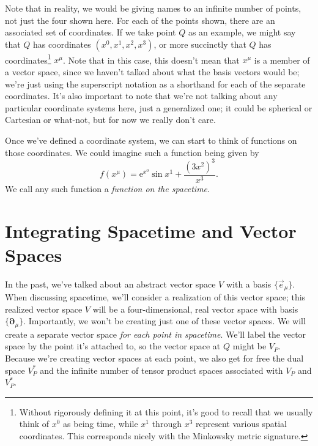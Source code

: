 Note that in reality, we would be giving names to an infinite number of points, not just the four shown here.
For each of the points shown, there are an associated set of coordinates.
If we take point $Q$ as an example, we might say that $Q$ has coordinates $(x^0,x^1,x^2,x^3)$, or more succinctly that $Q$ has coordinates\footnote{Without rigorously defining it at this point, it's good to recall that we usually think of $x^0$ as being time, while $x^1$ through $x^3$ represent various spatial coordinates. This corresponds nicely with the Minkowsky metric signature.} $x^\mu$.
Note that in this case, this doesn't mean that $x^\mu$ is a member of a vector space, since we haven't talked about what the basis vectors would be; we're just using the superscript notation as a shorthand for each of the separate coordinates.
It's also important to note that we're not talking about any particular coordinate systems here, just a generalized one; it could be spherical or Cartesian or what-not, but for now we really don't care.

Once we've defined a coordinate system, we can start to think of functions on those coordinates.
We could imagine such a function being given by
\[ f(x^\mu) = \mathrm{e}^{x^0}\sin x^1 + \frac{(3x^2)^3}{x^3}. \]
We call any such function a \emph{function on the spacetime}.

\section{Integrating Spacetime and Vector Spaces}
In the past, we've talked about an abstract vector space $V$ with a basis $\{\vec{e}_\mu\}$.
When discussing spacetime, we'll consider a realization of this vector space;
this realized vector space $V$ will be a four-dimensional, real vector space with basis $\{\bm{\partial}_\mu\}$.
Importantly, we won't be creating just one of these vector spaces.
We will create a separate vector space \emph{for each point in spacetime}.
We'll label the vector space by the point it's attached to, so the vector space at $Q$ might be $V_P$.
Because we're creating vector spaces at each point, we also get for free the dual space $V_P^*$ and the infinite number of tensor product spaces associated with $V_P$ and $V^*_P$.
